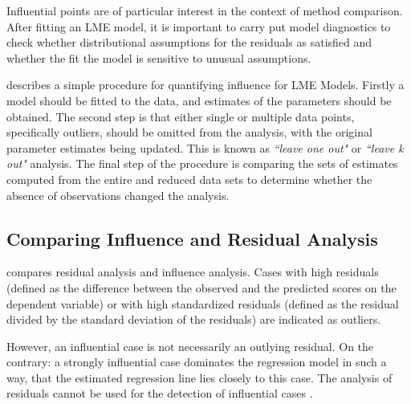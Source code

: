 \documentclass[12pt, a4paper]{report}
\theoremstyle{definition}
\theoremstyle{remark}
\begin{document}
Influential points are of particular interest in the context of method comparison. After fitting an LME model, it is important to carry put model diagnostics to check whether distributional assumptions for the residuals as satisfied and whether the fit the model is sensitive to unusual assumptions. 

\citet{schabenberger} describes a simple procedure for quantifying influence for LME Models. Firstly a model should be fitted to the data, and estimates of the parameters should be obtained. The second step is that either single or multiple data points, specifically outliers, should be omitted from the analysis, with the original parameter estimates being updated. This is known as \textit{``leave one out"} or \textit{``leave k out"} analysis. The final step of the procedure is comparing the sets of estimates computed from the entire and reduced data sets to determine whether the absence of observations changed the analysis. 



\subsection{Comparing Influence and Residual Analysis}

\citet{influenceLME4} compares residual analysis and influence analysis. Cases with high residuals (defined as the difference between the observed and the predicted scores on the dependent
variable) or with high standardized residuals (defined as the residual divided by the standard deviation
of the residuals) are indicated as outliers.

However, an influential case is not necessarily an outlying residual. On the contrary: a strongly influential case dominates
the regression model in such a way, that the estimated regression line lies closely to this case. The analysis of residuals cannot be used for the detection of influential cases \citep{crawley2012r}.
\end{document}
